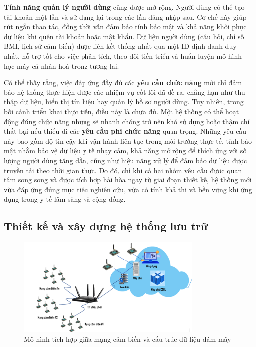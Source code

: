 \textbf{Tính năng quản lý người dùng} cũng được mở rộng. Người dùng có thể 
tạo tài khoản một lần và sử dụng lại trong các lần đăng nhập sau. Cơ chế này 
giúp rút ngắn thao tác, đồng thời vẫn đảm bảo tính bảo mật và khả năng khôi 
phục dữ liệu khi quên tài khoản hoặc mật khẩu. Dữ liệu người dùng 
(câu hỏi, chỉ số BMI, lịch sử cảm biến) được liên kết thống nhất qua một 
ID định danh duy nhất, hỗ trợ tốt cho việc phân tích, theo dõi tiến triển 
và huấn luyện mô hình học máy cá nhân hoá trong tương lai.

Có thể thấy rằng, việc đáp ứng đầy đủ các \textbf{yêu cầu chức năng} mới chỉ đảm bảo 
hệ thống thực hiện được các nhiệm vụ cốt lõi đã đề ra, chẳng hạn như thu thập dữ liệu, 
hiển thị tín hiệu hay quản lý hồ sơ người dùng. Tuy nhiên, trong bối cảnh triển khai thực tiễn, 
điều này là chưa đủ. Một hệ thống có thể hoạt động đúng chức năng nhưng sẽ nhanh chóng trở nên 
khó sử dụng hoặc thậm chí thất bại nếu thiếu đi các \textbf{yêu cầu phi chức năng} quan trọng. 
Những yêu cầu này bao gồm độ tin cậy khi vận hành liên tục trong môi trường thực tế, 
tính bảo mật nhằm bảo vệ dữ liệu y tế nhạy cảm, khả năng mở rộng để thích ứng với số lượng 
người dùng tăng dần, cũng như hiệu năng xử lý để đảm bảo dữ liệu được truyền tải theo thời gian thực. 
Do đó, chỉ khi cả hai nhóm yêu cầu được quan tâm song song và được tích hợp hài hòa 
ngay từ giai đoạn thiết kế, hệ thống mới vừa đáp ứng đúng mục tiêu nghiên cứu, 
vừa có tính khả thi và bền vững khi ứng dụng trong y tế lâm sàng và cộng đồng.

\subsection{Thiết kế và xây dựng hệ thống lưu trữ}
\begin{figure}[htbp]
    \centering
    \includegraphics[width=0.8\textwidth]{images/cloud.png}
    \caption{Mô hình tích hợp giữa mạng cảm biến và cấu trúc dữ liệu đám mây}
    \label{cloud}
\end{figure}

